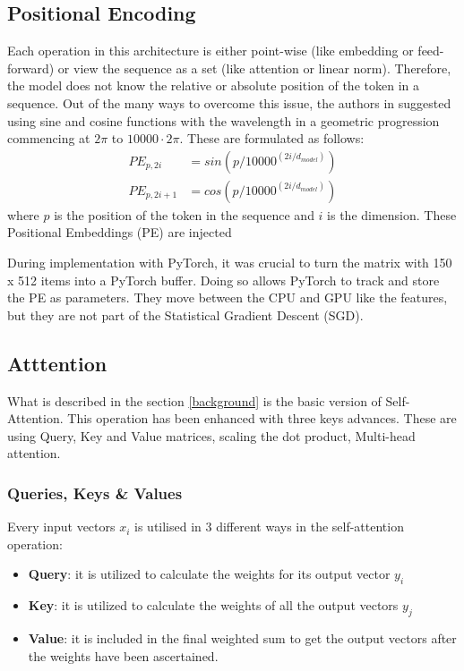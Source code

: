 \documentclass[12pt,a4paper,twoside,openright]{report}
\begin{document}
\subsection{Positional Encoding}
\label{pe}
Each operation in this architecture is either point-wise (like embedding or feed-forward) or view the sequence as a set (like attention or linear norm). Therefore, the model does not know the relative or absolute position of the token in a sequence.  Out of the many ways to overcome this issue, the authors in \cite{transformers} suggested using sine and cosine functions with the wavelength in a geometric progression commencing at $2\pi$ to $10000 \cdot 2\pi$. These are formulated as follows: 
\begin{align*}
    PE_{p, 2i} &= sin(p / 10000 ^ {(2i/d_{model})})\\
    PE_{p, 2i+1} &= cos(p / 10000 ^ {(2i/d_{model})})
\end{align*}
where $p$ is the position of the token in the sequence and $i$ is the dimension. These Positional Embeddings (PE) are injected 

During implementation with PyTorch, it was crucial to turn the matrix with 150 x 512 items into a PyTorch buffer. Doing so allows PyTorch to track and store the PE as parameters. They move between the CPU and GPU like the features, but they are not part of the Statistical Gradient Descent (SGD).

\subsection{{Atttention}}
\label{attention}

What is described in the section \ref{background}  is the basic version of Self-Attention. This operation has been enhanced with three keys advances. These are using Query, Key and Value matrices, scaling the dot product, Multi-head attention.

\subsubsection{Queries, Keys \& Values}

Every input vectors $x_i$ is utilised in 3 different ways in the self-attention operation:
\begin{itemize}
	\item \textbf{Query}:  it is utilized to calculate the weights for its output vector $y_i$
	\item \textbf{Key}:  it is utilized to calculate the weights of all the output vectors $y_j$
	\item \textbf{Value}:  it is included in the final weighted sum to get the output vectors after the weights have been ascertained. 
\end{itemize}
\end{document}
